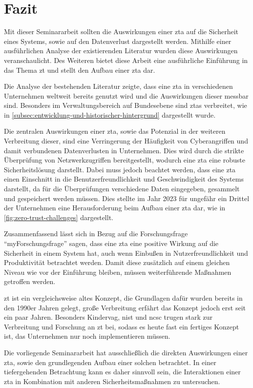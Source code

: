 \newpage
\section{Fazit}\label{sec:fazit}

Mit dieser Seminararbeit sollten die Auswirkungen einer \ac{zta} auf die Sicherheit eines Systems, sowie auf den Datenverlust dargestellt werden.
Mithilfe einer ausführlichen Analyse der existierenden Literatur wurden diese Auswirkungen veranschaulicht.
Des Weiteren bietet diese Arbeit eine ausführliche Einführung in das Thema \ac{zt} und stellt den Aufbau einer \ac{zta} dar.

Die Analyse der bestehenden Literatur zeigte, dass eine \ac{zta} in verschiedenen Unternehmen weltweit bereits genutzt wird und die Auswirkungen dieser messbar sind.
Besonders im Verwaltungsbereich auf Bundesebene sind \acp{zta} verbreitet, wie in \autoref{subsec:entwicklung-und-historischer-hintergrund} dargestellt wurde.

Die zentralen Auswirkungen einer \ac{zta}, sowie das Potenzial in der weiteren Verbreitung dieser, sind eine Verringerung der Häufigkeit von Cyberangriffen und damit verbundenen Datenverlusten in Unternehmen.
Dies wird durch die strikte Überprüfung von Netzwerkzugriffen bereitgestellt, wodurch eine \ac{zta} eine robuste Sicherheitslösung darstellt.
Dabei muss jedoch beachtet werden, dass eine \ac{zta} einen Einschnitt in die Benutzerfreundlichkeit und Geschwindigkeit des Systems darstellt, da für die Überprüfungen verschiedene Daten eingegeben, gesammelt und gespeichert werden müssen.
Dies stellte im Jahr 2023 für ungefähr ein Drittel der Unternehmen eine Herausforderung beim Aufbau einer \ac{zta} dar, wie in \autoref{fig:zero-trust-challenges} dargestellt.

Zusammenfassend lässt sich in Bezug auf die Forschungsfrage \enquote{myForschungsfrage} sagen, dass eine \ac{zta} eine positive Wirkung auf die Sicherheit in einem System hat, auch wenn Einbußen in Nutzerfreundlichkeit und Produktivität betrachtet werden.
Damit diese zusätzlich auf einem gleichen Niveau wie vor der Einführung bleiben, müssen weiterführende Maßnahmen getroffen werden.

\ac{zt} ist ein vergleichsweise altes Konzept, die Grundlagen dafür wurden bereits in den 1990er Jahren gelegt, große Verbreitung erfährt das Konzept jedoch erst seit ein paar Jahren.
Besonders Kindervag, \ac{nist} und \ac{ncsc} trugen stark zur Verbreitung und Forschung an \ac{zt} bei, sodass es heute fast ein fertiges Konzept ist, das Unternehmen nur noch implementieren müssen.\autocites{kindervag-2010}{NIST:800207}{ncsc-2021}

Die vorliegende Seminararbeit hat ausschließlich die direkten Auswirkungen einer \ac{zta}, sowie den grundlegenden Aufbau einer solchen betrachtet.
In einer tiefergehenden Betrachtung kann es daher sinnvoll sein, die Interaktionen einer \ac{zta} in Kombination mit anderen Sicherheitsmaßnahmen zu untersuchen.